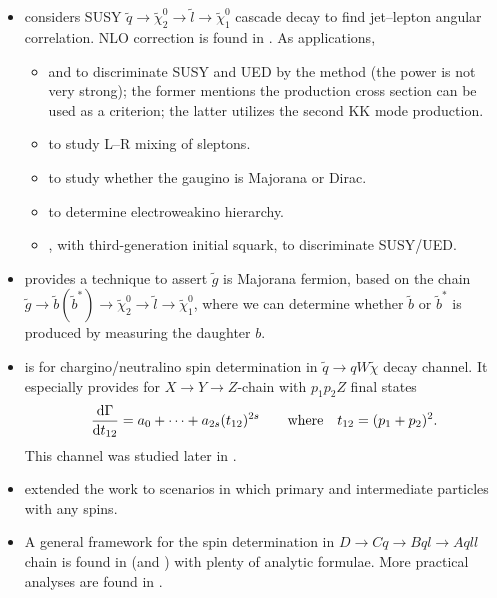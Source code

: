 \documentclass[10pt,a4paper]{article}
\newcommand{\dd}{{\rm d}}
\begin{document}
\begin{itemize}
 \item \cite{Barr:2004ze} considers SUSY $\tilde q \to \tilde\chi^0_2 \to \tilde l \to \tilde\chi^0_1$ cascade decay to find jet--lepton angular correlation. NLO correction is found in \cite{Horsky:2008yi}. As applications,
\begin{itemize}
 \item \cite{Smillie:2005ar} and \cite{Datta:2005zs} to discriminate SUSY and UED by the method (the power is not very strong); the former mentions the production cross section can be used as a criterion; the latter utilizes the second KK mode production.

 \item \cite{Goto:2004cpa} to study L--R mixing of sleptons.
 \item \cite{Choi:2008pi} to study whether the gaugino is Majorana or Dirac.
 \item \cite{Hisano:2008ng} to determine electroweakino hierarchy.
 \item \cite{Gedalia:2009ym}, with third-generation initial squark, to discriminate SUSY/UED.
\end{itemize}

 \item \cite{Alves:2006df} provides a technique to assert $\tilde g$ is Majorana fermion, based on the chain $\tilde g\to\tilde b(\tilde b^*)\to\tilde \chi^0_2\to\tilde l\to\tilde\chi^0_1$, where we can determine whether $\tilde b$ or $\tilde b^*$ is produced by measuring the daughter $b$.
%
 \item \cite{Wang:2006hk} is for chargino/neutralino spin determination in  $\tilde q\to qW\tilde\chi$ decay channel. It especially provides for $X\to Y\to Z$-chain with $p_1p_2Z$ final states
 \begin{equation}
  \frac{\dd\Gamma}{\dd t_{12}}=a_0+\cdots+a_{2s}(t_{12})^{2s}
   \qquad\text{where}\quad t_{12} = (p_1+p_2)^2.
 \end{equation}
       This channel was studied later in \cite{Smillie:2006cd}.

 \item \cite{Kilic:2007zk} extended the work to scenarios in which primary and intermediate particles with any spins.

 \item A general framework for the spin determination in $D\to Cq\to Bql\to Aqll$ chain is found in \cite{Athanasiou:2006ef} (and \cite{Athanasiou:2006hv}) with plenty of analytic formulae.
       More practical analyses are found in \cite{Burns:2008cp}.

\end{itemize}
\end{document}
